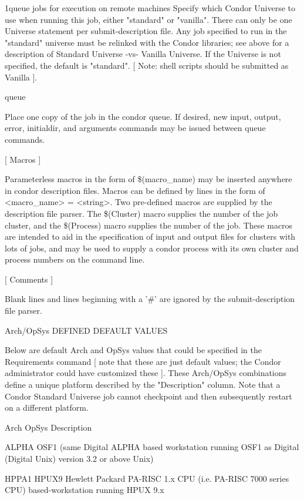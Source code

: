 \begin{ManPage}{}{1}{queue jobs for execution on remote machines}
Specify which Condor Universe to use when running this job, either "standard" or "vanilla". There can only be one Universe
statement per submit-description file. Any job specified to run in the "standard" universe must be relinked with the Condor
libraries; see above for a description of Standard Universe -vs- Vanilla Universe. If the Universe is not specified, the
default is "standard". [ Note: shell scripts should be submitted as Vanilla ]. 

queue 

Place one copy of the job in the condor queue. If desired, new input, output, error, initialdir, and arguments commands may
be issued between queue commands. 

[ Macros ] 

Parameterless macros in the form of \$(macro\_name) may be inserted anywhere in condor description files. Macros can be
defined by lines in the form of <macro\_name> = <string>. Two pre-defined macros are supplied by the description file
parser. The \$(Cluster) macro supplies the number of the job cluster, and the \$(Process) macro supplies the number of the
job. These macros are intended to aid in the specification of input and output files for clusters with lots of jobs, and may be
used to supply a condor process with its own cluster and process numbers on the command line. 

[ Comments ] 

Blank lines and lines beginning with a '\#' are ignored by the submit-description file parser. 

Arch/OpSys DEFINED DEFAULT VALUES 

Below are default Arch and OpSys values that could be specified in the Requirements command [ note that these are just
default values; the Condor administrator could have customized these ]. These Arch/OpSys combinations define a unique
platform described by the "Description" column. Note that a Condor Standard Universe job cannot checkpoint and then
subsequently restart on a different platform. 


Arch     OpSys        Description                                      

ALPHA    OSF1 (same   Digital ALPHA based workstation running OSF1     
         as Digital   (Digital Unix) version 3.2 or above              
         Unix)                                                         

HPPA1    HPUX9        Hewlett Packard PA-RISC 1.x CPU (i.e. PA-RISC    
                      7000 series CPU) based-workstation running HPUX  
                      9.x                                              


\end{ManPage}
